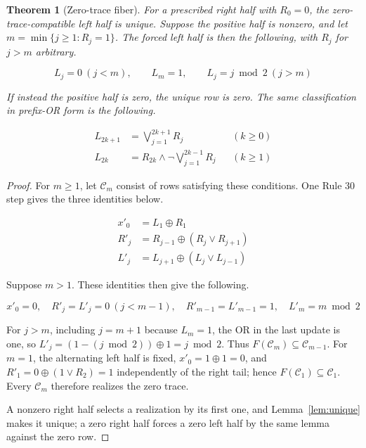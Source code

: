 \documentclass[11pt]{article}
\newtheorem{theorem}{Theorem}
\begin{document}
\begin{theorem}[Zero-trace fiber]\label{thm:fiber}
For a prescribed right half with $R_0=0$, the zero-trace-compatible left half
is unique.  Suppose the positive half is nonzero, and let
$m=\min\{j\geq1:R_j=1\}$.  The forced left half is then the following, with
$R_j$ for $j>m$ arbitrary.

\begin{equation}\label{eq:pattern}
 L_j=0\ (j<m),\qquad L_m=1,\qquad L_j=j\bmod2\ (j>m)
\end{equation}

If instead the positive half is zero, the unique row is zero.  The same
classification in prefix-OR form is the following.

\begin{align}
 L_{2k+1}&=\bigvee_{j=1}^{2k+1}R_j &&(k\geq0) \label{eq:odd}\\[-2pt]
 L_{2k}&=R_{2k}\land\neg\!\bigvee_{j=1}^{2k-1}R_j &&(k\geq1) \label{eq:even}
\end{align}
\end{theorem}
\begin{proof}
For $m\geq1$, let $\mathcal C_m$ consist of rows satisfying these conditions.
One Rule 30 step gives the three identities below.

\begin{equation}\label{eq:updates}
\begin{aligned}
 x'_0&=L_1\oplus R_1\\
 R'_j&=R_{j-1}\oplus(R_j\lor R_{j+1})\\
 L'_j&=L_{j+1}\oplus(L_j\lor L_{j-1})
\end{aligned}
\end{equation}

Suppose $m>1$.  These identities then give the following.

\begin{equation}\label{eq:step}
 x'_0=0,\quad R'_j=L'_j=0\ (j<m-1),\quad R'_{m-1}=L'_{m-1}=1,
 \quad L'_m=m\bmod2
\end{equation}

For $j>m$, including $j=m+1$ because $L_m=1$, the OR in the last update is
one, so $L'_j=(1-(j\bmod2))\oplus1=j\bmod2$.  Thus
$F(\mathcal C_m)\subseteq\mathcal C_{m-1}$.  For $m=1$, the alternating left
half is fixed, $x'_0=1\oplus1=0$, and
$R'_1=0\oplus(1\lor R_2)=1$ independently of the right tail; hence
$F(\mathcal C_1)\subseteq\mathcal C_1$.  Every $\mathcal C_m$ therefore
realizes the zero trace.

A nonzero right half selects a realization by its first one, and
Lemma~\ref{lem:unique} makes it unique; a zero right half forces a zero left
half by the same lemma against the zero row.
\end{proof}
\end{document}
